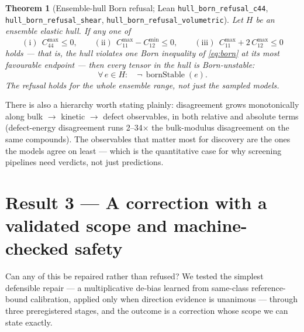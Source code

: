 \documentclass[11pt]{article}
\newtheorem{theorem}{Theorem}
\theoremstyle{definition}
\theoremstyle{remark}
\newcommand{\code}[1]{\texttt{#1}}
\begin{document}
\begin{theorem}[Ensemble-hull Born refusal; Lean \code{hull\_born\_refusal\_c44}, \code{hull\_born\_\allowbreak refusal\_shear}, \code{hull\_born\_\allowbreak refusal\_volumetric}]\label{thm:hull}
Let $H$ be an ensemble elastic hull. If any one of
\begin{equation}\label{eq:hullrefusal}
\mathrm{(i)}\ \ C_{44}^{\max} \le 0,
\qquad
\mathrm{(ii)}\ \ C_{11}^{\max} - C_{12}^{\min} \le 0,
\qquad
\mathrm{(iii)}\ \ C_{11}^{\max} + 2\,C_{12}^{\max} \le 0
\end{equation}
holds --- that is, the hull violates one Born inequality of \eqref{eq:born} at its most favourable endpoint --- then \emph{every} tensor in the hull is Born-unstable:
\begin{equation}\label{eq:hullconclusion}
\forall\, e \in H:\quad \neg\,\operatorname{bornStable}(e).
\end{equation}
The refusal holds for the whole ensemble range, not just the sampled models.
\end{theorem}

There is also a hierarchy worth stating plainly: disagreement grows monotonically along bulk $\to$ kinetic $\to$ defect observables, in both relative and absolute terms (defect-energy disagreement runs 2--34$\times$ the bulk-modulus disagreement on the same compounds). The observables that matter most for discovery are the ones the models agree on least --- which is the quantitative case for why screening pipelines need verdicts, not just predictions.

\section*{Result 3 --- A correction with a validated scope and machine-checked safety}

Can any of this be repaired rather than refused? We tested the simplest defensible repair --- a multiplicative de-bias learned from same-class reference-bound calibration, applied only when direction evidence is unanimous --- through three preregistered stages, and the outcome is a correction whose scope we can state exactly.
\end{document}
